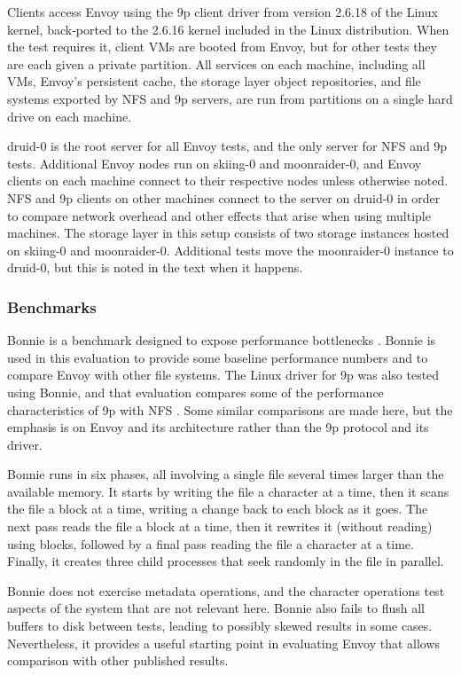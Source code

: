 Clients access Envoy using the 9p client driver from version 2.6.18 of the Linux kernel, back-ported to the 2.6.16 kernel included in the Linux distribution. When the test requires it, client VMs are booted from Envoy, but for other tests they are each given a private partition. All services on each machine, including all VMs, Envoy's persistent cache, the storage layer object repositories, and file systems exported by NFS and 9p servers, are run from partitions on a single hard drive on each machine.

druid-0 is the root server for all Envoy tests, and the only server for NFS and 9p tests. Additional Envoy nodes run on skiing-0 and moonraider-0, and Envoy clients on each machine connect to their respective nodes unless otherwise noted. NFS and 9p clients on other machines connect to the server on druid-0 in order to compare network overhead and other effects that arise when using multiple machines. The storage layer in this setup consists of two storage instances hosted on skiing-0 and moonraider-0. Additional tests move the moonraider-0 instance to druid-0, but this is noted in the text when it happens.

\subsubsection{Benchmarks}

Bonnie is a benchmark designed to expose performance bottlenecks \cite{bray}. Bonnie is used in this evaluation to provide some baseline performance numbers and to compare Envoy with other file systems. The Linux driver for 9p was also tested using Bonnie, and that evaluation compares some of the performance characteristics of 9p with NFS \cite{hensbergen}. Some similar comparisons are made here, but the emphasis is on Envoy and its architecture rather than the 9p protocol and its driver.

Bonnie runs in six phases, all involving a single file several times larger than the available memory. It starts by writing the file a character at a time, then it scans the file a block at a time, writing a change back to each block as it goes. The next pass reads the file a block at a time, then it rewrites it (without reading) using blocks, followed by a final pass reading the file a character at a time. Finally, it creates three child processes that seek randomly in the file in parallel.

Bonnie does not exercise metadata operations, and the character operations test aspects of the system that are not relevant here. Bonnie also fails to flush all buffers to disk between tests, leading to possibly skewed results in some cases. Nevertheless, it provides a useful starting point in evaluating Envoy that allows comparison with other published results.

